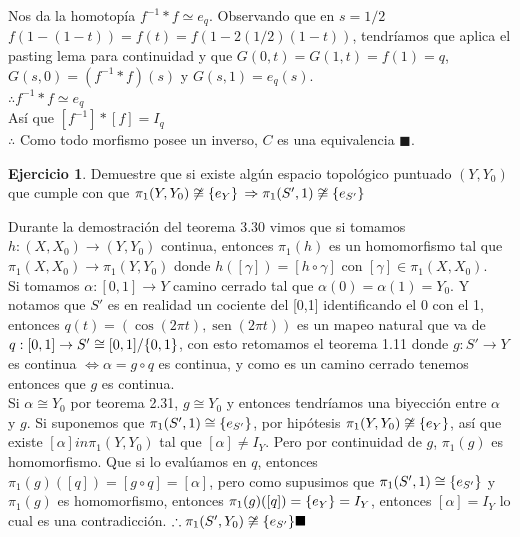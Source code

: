 \documentclass[11pt,a4paper,oneside]{report}
\theoremstyle{definition}
\newtheorem{ejercicio}[definicion]{Ejercicio}
\theoremstyle{plain}
\theoremstyle{remark}
\DeclarePairedDelimiter{\conj}{\{}{\}}
\DeclareMathOperator{\sen}{sen}
\begin{document}
Nos da la homotopía $f^{-1}*f\simeq e_q$. Observando que en $s=1/2$ $f(1-(1-t))=f(t)=f(1-2(1/2)(1-t))$, tendríamos 
que aplica el pasting lema para continuidad y que $G(0,t)=G(1,t)=f(1)=q$, $G(s,0)=(f^{-1}*f)(s)$ y $G(s,1)=e_q(s)$.\\
$\therefore f^{-1}*f \simeq e_q$\\
Así que $[f^{-1}]*[f]=I_q$ \\
$\therefore$ Como todo morfismo posee un inverso, $C$ es una equivalencia $\blacksquare$.
\begin{ejercicio}
  Demuestre que si existe algún espacio topológico puntuado $(Y,Y_0)$ que cumple con que $\pi_1(Y,Y_0)\not\cong \conj{e_Y}$
  $\Rightarrow \pi_1(S',1) \not\cong \conj{e_{S'}}$
\end{ejercicio}
Durante la demostración del teorema 3.30 vimos que si tomamos $h:(X,X_0) \rightarrow (Y,Y_0)$ continua, entonces 
$\pi_1(h)$ es un homomorfismo tal que $\pi_1(X,X_0)\rightarrow \pi_1(Y, Y_0)$ donde $h([\gamma])=[h\circ \gamma]$
con $[\gamma] \in \pi_1 (X,X_0)$. \\
Si tomamos $\alpha : [0,1]\rightarrow Y$ camino cerrado tal que $\alpha(0)=\alpha(1)=Y_0$. Y notamos que $S'$ es 
en realidad un cociente del [0,1] identificando el 0 con el 1, entonces $q(t)=(\cos(2\pi t), \sen(2 \pi t))$ es
un mapeo natural que va de $q:[0,1]\rightarrow S' \cong [0,1]/\conj{0,1}$, con esto retomamos el teorema 1.11 
donde $g:S'\rightarrow Y$ es continua $\iff \alpha = g \circ q$ es continua, y como es un camino cerrado tenemos
entonces que $g$ es continua.\\
Si $\alpha \cong Y_0$ por teorema 2.31, $g \cong Y_0$ y entonces tendríamos una biyección entre $\alpha$ y $g$. 
Si suponemos que $\pi_1(S',1) \cong \conj{e_{S'}}$, por hipótesis $\pi_1(Y,Y_0)\not\cong \conj{e_Y}$, así que
existe $[\alpha]in \pi_1(Y,Y_0)$ tal que $[\alpha]\not =I_Y$. Pero por continuidad de $g$, $\pi_1(g)$ es homomorfismo. 
Que si lo evalúamos en $q$, entonces $\pi_1(g)([q])=[g \circ q]=[\alpha]$, pero como supusimos que 
$\pi_1(S',1)\cong \conj{e_{S'}}$ y $\pi_1(g)$ es homomorfismo, entonces $\pi_1(g)([q])=\conj{e_Y}=I_Y$, entonces
$[\alpha]=I_Y$ lo cual es una contradicción.
$\therefore \pi_1(S', Y_0) \not \cong \conj{e_{S'}} \blacksquare$
\printindex
\end{document}
